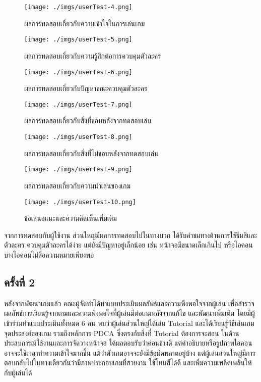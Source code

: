 \documentclass[12pt,oneside,openright,a4paper]{cpe-thai-project}
\begin{document}
  \begin{figure}[H]\centering
    \texttt{[image: ./imgs/userTest-4.png]}
    \caption{ผลการทดสอบเกี่ยวกับความเข้าใจในการเล่นเกม}\label{fig:userTest-4}
  \end{figure}

  \begin{figure}[H]\centering
    \texttt{[image: ./imgs/userTest-5.png]}
    \caption{ผลการทดสอบเกี่ยวกับความรู้สึกต่อการควบคุมตัวละคร}\label{fig:userTest-5}
  \end{figure}

  \begin{figure}[H]\centering
    \texttt{[image: ./imgs/userTest-6.png]}
    \caption{ผลการทดสอบเกี่ยวกับปัญหาขณะควบคุมตัวละคร}\label{fig:userTest-6}
  \end{figure}

  \begin{figure}[H]\centering
    \texttt{[image: ./imgs/userTest-7.png]}
    \caption{ผลการทดสอบเกี่ยวกับสิ่งที่ชอบหลังจากทดสอบเล่น}\label{fig:userTest-7}
  \end{figure}

  \begin{figure}[H]\centering
    \texttt{[image: ./imgs/userTest-8.png]}
    \caption{ผลการทดสอบเกี่ยวกับสิ่งที่ไม่ชอบหลังจากทดสอบเล่น}\label{fig:userTest-8}
  \end{figure}

  \begin{figure}[H]\centering
    \texttt{[image: ./imgs/userTest-9.png]}
    \caption{ผลการทดสอบเกี่ยวกับความน่าเล่นของเกม}\label{fig:userTest-9}
  \end{figure}

  \begin{figure}[H]\centering
    \texttt{[image: ./imgs/userTest-10.png]}
    \caption{ข้อเสนอแนะและความคิดเห็นเพิ่มเติม}\label{fig:userTest-10}
  \end{figure}

  จากการทดสอบกับผู้ใช้งาน ส่วนใหญ่มีผลการทดสอบไปในทางบวก 
  ได้รับคำชมทางด้านการใช้ธีมสีและตัวละคร ควบคุมตัวละครได้ง่าย 
  แต่ยังมีปัญหาอยู่เล็กน้อย เช่น หน้าจอมีขนาดเล็กเกินไป หรือไอคอนบางไอคอนไม่สื่อความหมายเพียงพอ
  
  \pagebreak
  \subsection{ครั้งที่ 2}
  หลังจากพัฒนาเกมแล้ว คณะผู้จัดทำได้ทำแบบประเมินผลลัพธ์และความพึงพอใจจากผู้เล่น
  เพื่อสำรวจผลลัพธ์การเรียนรู้จากเกมและความพึงพอใจที่ผู้เล่นมีต่อเกมหลังจากแก้ไข
  และพัฒนาเพิ่มเติม โดยมีผู้เข้าร่วมทำแบบประเมินทั้งหมด 6 คน
  พบว่าผู้เล่นส่วนใหญ่ได้เล่น Tutorial และได้เรียนรู้วิธีเล่นเกม
  จุดประสงค์ของเกม รวมถึงหลักการ PDCA ซึ่งตรงกับสิ่งที่ Tutorial ต้องการจะสอน
  ในด้านประสบการณ์ใช้งานและการจัดวางหน้าจอ ได้ผลตอบรับว่าค่อนข้างดี
  แต่คำอธิบายหรือรูปภาพไอคอนอาจจะใช้เวลาทำความเข้าใจมากขึ้น
  แม้ว่าตัวเกมอาจจะยังมีข้อผิดพลาดอยู่บ้าง
  แต่ผู้เล่นส่วนใหญ่มีการตอบกลับไปในทางเดียวกันว่ามีภาพประกอบเกมที่สวยงาม
  ใช้โทนสีได้ดี และเพิ่มความเพลิดเพลินให้กับผู้เล่นได้
\end{document}
